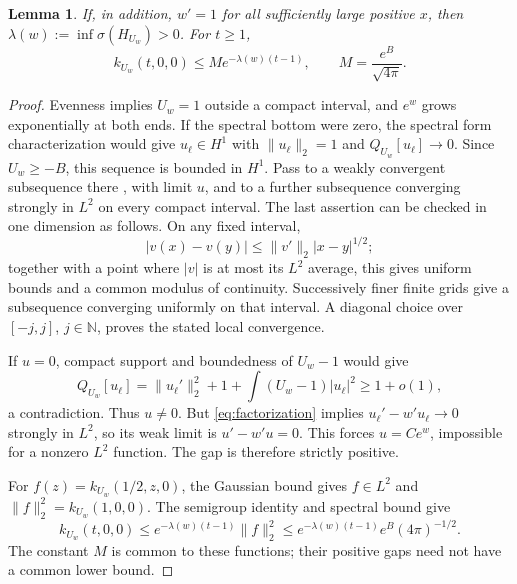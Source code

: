 \documentclass[11pt,a4paper]{article}
\newtheorem{lemma}[theorem]{Lemma}
\newcommand{\N}{\mathbb N}
\newcommand{\spec}{\sigma}
\begin{document}
\begin{lemma}\label{lem:gap}
If, in addition, $w'=1$ for all sufficiently large positive $x$, then
$\lambda(w):=\inf\spec(H_{U_w})>0$. For $t\geq1$,
\begin{equation}\label{eq:gap-kernel}
 k_{U_w}(t,0,0)\leq M e^{-\lambda(w)(t-1)},
 \qquad M=\frac{e^B}{\sqrt{4\pi}}.
\end{equation}
\end{lemma}
\begin{proof}
Evenness implies $U_w=1$ outside a compact interval, and $e^w$ grows
exponentially at both ends. If the spectral bottom were zero, the spectral
form characterization \cite[Theorem 3.7 and equations (3.50)--(3.51)]{Teschl}
would give $u_\ell\in H^1$ with $\|u_\ell\|_2=1$ and
$Q_{U_w}[u_\ell]\to0$. Since $U_w\geq-B$, this sequence is bounded in
$H^1$. Pass to a weakly convergent subsequence there
\cite[Lemma 1.13]{Teschl}, with limit $u$, and to a further subsequence
converging strongly in $L^2$ on every compact interval. The last assertion
can be checked in one dimension as follows. On any fixed interval,
\[
 |v(x)-v(y)|\leq\|v'\|_2|x-y|^{1/2};
\]
together with a point where $|v|$ is at most its $L^2$ average, this gives
uniform bounds and a common modulus of continuity. Successively finer finite
grids give a subsequence converging uniformly on that interval. A diagonal
choice over $[-j,j]$, $j\in\N$, proves the stated local convergence.

If $u=0$, compact support and boundedness of $U_w-1$ would give
\[
 Q_{U_w}[u_\ell]=\|u_\ell'\|_2^2+1+
                 \int(U_w-1)|u_\ell|^2\geq1+o(1),
\]
a contradiction. Thus $u\ne0$. But \eqref{eq:factorization} implies
$u_\ell'-w'u_\ell\to0$ strongly in $L^2$, so its weak limit is
$u'-w'u=0$. This forces $u=Ce^w$, impossible for a nonzero $L^2$ function.
The gap is therefore strictly positive.

For $f(z)=k_{U_w}(1/2,z,0)$, the Gaussian bound gives $f\in L^2$ and
$\|f\|_2^2=k_{U_w}(1,0,0)$. The semigroup identity and spectral bound give
\[
 k_{U_w}(t,0,0)\leq e^{-\lambda(w)(t-1)}\|f\|_2^2
       \leq e^{-\lambda(w)(t-1)}e^B(4\pi)^{-1/2}.
\]
The constant $M$ is common to these functions; their positive gaps need not
have a common lower bound.
\end{proof}
\end{document}
